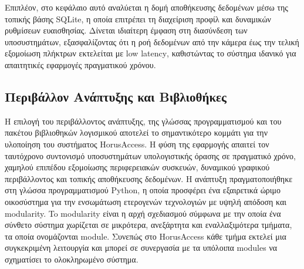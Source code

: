 \documentclass[twoside, a4paper, 11pt]{article}
\newcommand{\textlatin}[1]{\textenglish{#1}}
\begin{document}
Επιπλέον, στο κεφάλαιο αυτό αναλύεται η δομή αποθήκευσης δεδομένων μέσω της τοπικής βάσης \textlatin{SQLite},
 η οποία επιτρέπει τη διαχείριση προφίλ και δυναμικών ρυθμίσεων ευαισθησίας. 
 Δίνεται ιδιαίτερη έμφαση στη διασύνδεση των υποσυστημάτων, εξασφαλίζοντας ότι η ροή δεδομένων από την κάμερα έως την 
 τελική εξομοίωση πλήκτρων εκτελείται με \textlatin{low latency}, καθιστώντας το σύστημα ιδανικό για
  απαιτητικές εφαρμογές πραγματικού χρόνου.

\subsection{Περιβάλλον Ανάπτυξης και Βιβλιοθήκες}

Η επιλογή του περιβάλλοντος ανάπτυξης, της γλώσσας προγραμματισμού και του 
πακέτου βιβλιοθηκών λογισμικού αποτελεί το σημαντικότερο κομμάτι 
για την υλοποίηση του συστήματος HorusAccess. 
Η φύση της εφαρμογής απαιτεί τον ταυτόχρονο συντονισμό υποσυστημάτων υπολογιστικής όρασης 
σε πραγματικό χρόνο, χαμηλού επιπέδου εξομοίωσης περιφερειακών συσκευών, 
δυναμικού γραφικού περιβάλλοντος και τοπικής αποθήκευσης δεδομένων. Η ανάπτυξη 
πραγματοποιήθηκε στη γλώσσα προγραμματισμού Python, η οποία προσφέρει ένα εξαιρετικά 
ώριμο οικοσύστημα για την ενσωμάτωση ετερογενών τεχνολογιών με υψηλή απόδοση και modularity.
To modularity είναι η αρχή σχεδιασμού σύμφωνα με την οποία ένα σύνθετο σύστημα χωρίζεται 
σε μικρότερα, ανεξάρτητα και εναλλαξιμότερα τμήματα, τα οποία ονομάζονται module.
Συνεπώς στο HorusAccess κάθε τμήμα εκτελεί μια συγκεκριμένη λειτουργία και μπορεί σε συνεργασία με τα υπόλοιπα modules να σχηματίσει το ολοκληρωμένο σύστημα.
\end{document}
